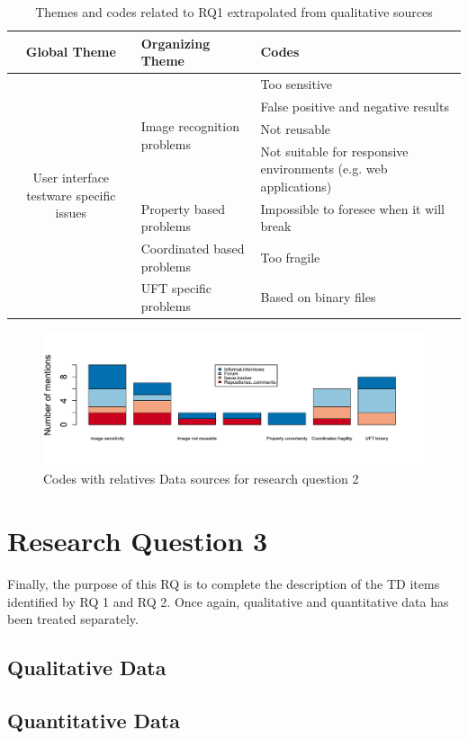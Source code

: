   
\begin{table}
\renewcommand{\arraystretch}{1.5}
\centering
\begin{tabular}{ c p{4.3cm} p{4.6cm}}
    
    \hline       
    {\large Global Theme} & {\large Organizing Theme} & {\large Codes}\\
    \hline
    
    \multirow{7}{*}{\parbox[b]{4.3cm}{
        User interface testware specific issues
    }
    } & \multirow{4}{*}{\parbox[c]{4.3cm}{Image recognition problems}}
        & Too sensitive \\
        & & False positive and negative results\\
        & & Not reusable\\ 
        & & Not suitable for responsive environments (e.g. web applications)\\ \cline{2-3}
        
    & Property based problems & Impossible to foresee when it will break\\ \cline{2-3}
        
    & Coordinated based problems  & Too fragile\\ \cline{2-3}
        
    & UFT specific problems & Based on binary files\\
        
    \hline
\end{tabular}
\caption{Themes and codes related to RQ1 extrapolated from qualitative sources}
\label{tab:themes_rq2}
\end{table}

\begin{figure}[!htbp]
    \centering
    \includegraphics[width=\textwidth,keepaspectratio]{figure/results/rq2/sources.pdf}
    \caption{Codes with relatives Data sources for research question 2}
    \label{fig:rq2_sources}
\end{figure}


\section{Research Question 3}

Finally, the purpose of this RQ is to complete the description of the TD items identified by RQ 1 and RQ 2. Once again, qualitative and quantitative data has been treated separately.

\subsection{Qualitative Data}
    

\subsection{Quantitative Data}
    

